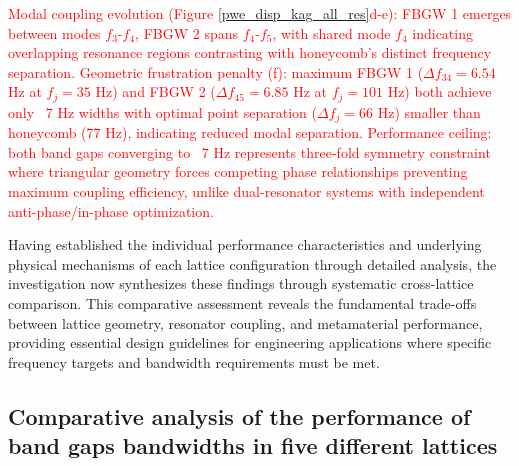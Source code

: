 \documentclass[review,numbers,sort&compress]{elsarticle}
\begin{document}
\textcolor{red}{Modal coupling evolution (Figure \ref{pwe_disp_kag_all_res}d-e): FBGW 1 emerges between modes \( f_3 \)-\( f_4 \), FBGW 2 spans \( f_4 \)-\( f_5 \), with shared mode \( f_4 \) indicating overlapping resonance regions contrasting with honeycomb's distinct frequency separation. Geometric frustration penalty (f): maximum FBGW 1 (\( \Delta f_{34} = 6.54 \) Hz at \( f_j = 35 \) Hz) and FBGW 2 (\( \Delta f_{45} = 6.85 \) Hz at \( f_j = 101 \) Hz) both achieve only ~7 Hz widths with optimal point separation (\( \Delta f_j = 66 \) Hz) smaller than honeycomb (77 Hz), indicating reduced modal separation. Performance ceiling: both band gaps converging to ~7 Hz represents three-fold symmetry constraint where triangular geometry forces competing phase relationships preventing maximum coupling efficiency, unlike dual-resonator systems with independent anti-phase/in-phase optimization.}


Having established the individual performance characteristics and underlying physical mechanisms of each lattice configuration through detailed analysis, the investigation now synthesizes these findings through systematic cross-lattice comparison. This comparative assessment reveals the fundamental trade-offs between lattice geometry, resonator coupling, and metamaterial performance, providing essential design guidelines for engineering applications where specific frequency targets and bandwidth requirements must be met.

\subsection{Comparative analysis of the performance of band gaps bandwidths in five different lattices}
\label{comp_performance_lattices}
\end{document}
